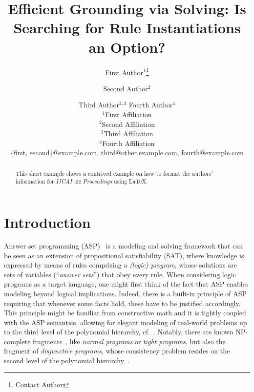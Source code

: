 \documentclass{article}
\title{Efficient Grounding via Solving: Is Searching for Rule Instantiations an Option?} %
\author{
First Author$^1$\footnote{Contact Author}\and
Second Author$^2$\and
Third Author$^{2,3}$\And
Fourth Author$^4$\\
\affiliations
$^1$First Affiliation\\
$^2$Second Affiliation\\
$^3$Third Affiliation\\
$^4$Fourth Affiliation\\
\emails
\{first, second\}@example.com,
third@other.example.com,
fourth@example.com
}
\begin{document}
\maketitle

\begin{abstract}
This short example shows a contrived example on how to format the authors' information for {\it IJCAI--22 Proceedings} using \LaTeX{}.
\end{abstract}

\section{Introduction}

Answer set programming (ASP)~\cite{BrewkaEiterTruszczynski11,GebserEtAl19,%
JanhunenNiemela16a} is a modeling and solving framework
that can be seen as an extension of propositional satisfiability (SAT),
where knowledge is expressed by means of rules comprising a \emph{(logic) program}, whose solutions are sets of variables (``\emph{answer sets}'') that obey every rule.
%
%
%
%
When considering logic programs as a target language, one might first
think of the fact that ASP enables modeling beyond logical implications.
%
Indeed, there is a built-in principle of ASP requiring that whenever some facts
hold, these have to be justified accordingly. %
%
This principle might be familiar from constructive math
and it is 
tightly coupled with the ASP semantics,
allowing for 
elegant modeling of real-world problems up to the third level
of the polynomial hierarchy, cf.~\cite{}. %
%
Notably, there are known NP-complete fragments~\cite{}, like %
\emph{normal programs} or \emph{tight programs}, but also the fragment of \emph{disjunctive programs}, whose consistency problem resides on the second level of the polynomial hierarchy~\cite{}.
\end{document}
